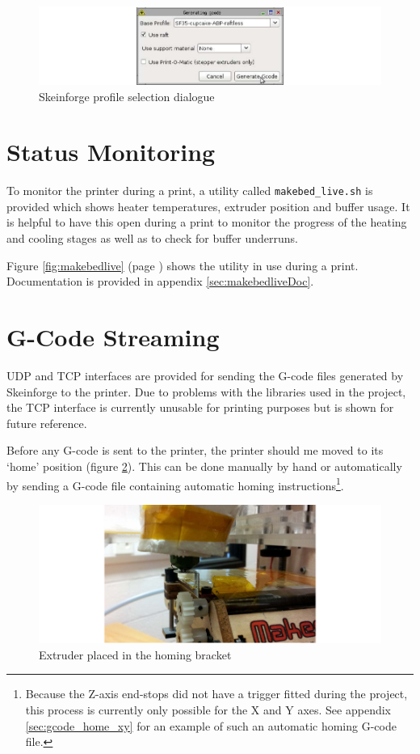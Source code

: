 		\begin{figure}
			\includegraphics[width=1\textwidth]{diagrams/skeinforge.pdf}
			\caption{Skeinforge profile selection dialogue}
			\label{fig:skeinforge}
		\end{figure}
	
	\section{Status Monitoring}
		
		To monitor the printer during a print, a utility called
		\verb|makebed_live.sh| is provided which shows heater temperatures, extruder
		position and buffer usage. It is helpful to have this open during a print to
		monitor the progress of the heating and cooling stages as well as to check
		for buffer underruns.
		
		Figure \ref{fig:makebedlive} (page \pageref{fig:makebedlive}) shows the
		utility in use during a print. Documentation is provided in appendix
		\ref{sec:makebedliveDoc}.
		
	\section{G-Code Streaming}
		
		UDP and TCP interfaces are provided for sending the G-code files generated
		by Skeinforge to the printer. Due to problems with the libraries used in the
		project, the TCP interface is currently unusable for printing purposes but
		is shown for future reference.
		
		Before any G-code is sent to the printer, the printer should me moved to its
		`home' position (figure \ref{fig:homing}). This can be done manually by hand
		or automatically by sending a G-code file containing automatic homing
		instructions\footnote{Because the Z-axis end-stops did not have a trigger
		fitted during the project, this process is currently only possible for the X
		and Y axes. See appendix \ref{sec:gcode_home_xy} for an example of such an
		automatic homing G-code file.}.
		
		\begin{figure}
			\includegraphics[width=1\textwidth]{diagrams/homing.pdf}
			\caption{Extruder placed in the homing bracket}
			\label{fig:homing}
		\end{figure}
			
